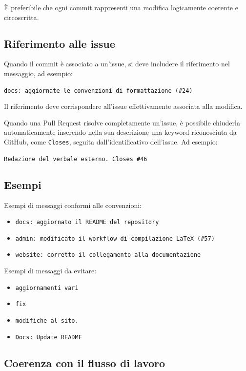 \documentclass[11pt, a4paper]{article}
\begin{document}
\noindent È preferibile che ogni commit rappresenti una modifica logicamente coerente e circoscritta.

\subsection{Riferimento alle issue}

Quando il commit è associato a un'issue, si deve includere il riferimento nel messaggio, ad esempio:

\noindent \texttt{docs: aggiornate le convenzioni di formattazione (\#24)}

\noindent Il riferimento deve corrispondere all'issue effettivamente associata alla modifica.

Quando una Pull Request risolve completamente un'issue, è possibile chiuderla automaticamente inserendo nella sua descrizione una keyword riconosciuta da GitHub, come \texttt{Closes}, seguita dall'identificativo dell'issue. Ad esempio:

\noindent \texttt{Redazione del verbale esterno. Closes \#46}

\subsection{Esempi}

Esempi di messaggi conformi alle convenzioni:
\begin{itemize}
    \item \texttt{docs: aggiornato il README del repository}
    \item \texttt{admin: modificato il workflow di compilazione LaTeX (\#57)}
    \item \texttt{website: corretto il collegamento alla documentazione}
\end{itemize}

\noindent Esempi di messaggi da evitare:
\begin{itemize}
    \item \texttt{aggiornamenti vari}
    \item \texttt{fix}
    \item \texttt{modifiche al sito.}
    \item \texttt{Docs: Update README}
\end{itemize}

\subsection{Coerenza con il flusso di lavoro}
\end{document}

